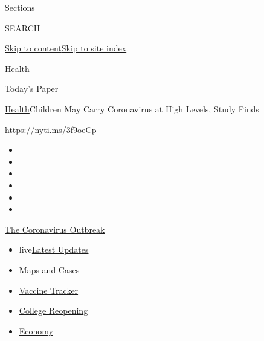 Sections

SEARCH

\protect\hyperlink{site-content}{Skip to
content}\protect\hyperlink{site-index}{Skip to site index}

\href{https://www.nytimes.com/section/health}{Health}

\href{https://myaccount.nytimes.com/auth/login?response_type=cookie\&client_id=vi}{}

\href{https://www.nytimes.com/section/todayspaper}{Today's Paper}

\href{/section/health}{Health}\textbar{}Children May Carry Coronavirus
at High Levels, Study Finds

\url{https://nyti.ms/3f9oeCp}

\begin{itemize}
\item
\item
\item
\item
\item
\item
\end{itemize}

\href{https://www.nytimes.com/news-event/coronavirus?action=click\&pgtype=Article\&state=default\&region=TOP_BANNER\&context=storylines_menu}{The
Coronavirus Outbreak}

\begin{itemize}
\tightlist
\item
  live\href{https://www.nytimes.com/2020/08/03/world/coronavirus-covid-19.html?action=click\&pgtype=Article\&state=default\&region=TOP_BANNER\&context=storylines_menu}{Latest
  Updates}
\item
  \href{https://www.nytimes.com/interactive/2020/us/coronavirus-us-cases.html?action=click\&pgtype=Article\&state=default\&region=TOP_BANNER\&context=storylines_menu}{Maps
  and Cases}
\item
  \href{https://www.nytimes.com/interactive/2020/science/coronavirus-vaccine-tracker.html?action=click\&pgtype=Article\&state=default\&region=TOP_BANNER\&context=storylines_menu}{Vaccine
  Tracker}
\item
  \href{https://www.nytimes.com/2020/08/02/us/covid-college-reopening.html?action=click\&pgtype=Article\&state=default\&region=TOP_BANNER\&context=storylines_menu}{College
  Reopening}
\item
  \href{https://www.nytimes.com/live/2020/08/03/business/stock-market-today-coronavirus?action=click\&pgtype=Article\&state=default\&region=TOP_BANNER\&context=storylines_menu}{Economy}
\end{itemize}

